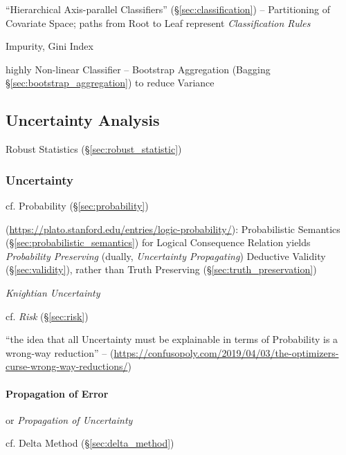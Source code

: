 ``Hierarchical Axis-parallel Classifiers'' (\S\ref{sec:classification}) --
Partitioning of Covariate Space; paths from Root to Leaf represent
\emph{Classification Rules}

Impurity, Gini Index

highly Non-linear Classifier --
Bootstrap Aggregation (Bagging \S\ref{sec:bootstrap_aggregation}) to reduce
Variance



\subsection{Uncertainty Analysis}\label{sec:uncertainty_analysis}

\fist Robust Statistics (\S\ref{sec:robust_statistic})



\subsubsection{Uncertainty}\label{sec:uncertainty}

cf. Probability (\S\ref{sec:probability})

(\url{https://plato.stanford.edu/entries/logic-probability/}): Probabilistic
Semantics (\S\ref{sec:probabilistic_semantics}) for Logical Consequence Relation
yields \emph{Probability Preserving} (dually, \emph{Uncertainty Propagating})
Deductive Validity (\S\ref{sec:validity}), rather than Truth Preserving
(\S\ref{sec:truth_preservation})

\emph{Knightian Uncertainty}

cf. \emph{Risk} (\S\ref{sec:risk})

``the idea that all Uncertainty must be explainable in terms of Probability is a
wrong-way reduction'' --
(\url{https://confusopoly.com/2019/04/03/the-optimizers-curse-wrong-way-reductions/})



\paragraph{Propagation of Error}\label{sec:error_propagation}\hfill

or \emph{Propagation of Uncertainty}

\fist cf. Delta Method (\S\ref{sec:delta_method})



